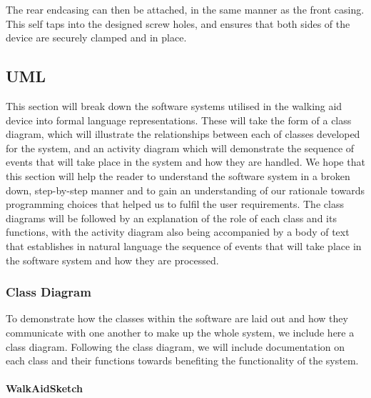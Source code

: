             The rear endcasing can then be attached, in the same manner as the front casing. This self taps into the designed screw holes, and ensures that both sides of the device are securely clamped and in place.


        \subsection{UML}
        \label{sec:uml_walk_aid}
        
            This section will break down the software systems utilised in the walking aid device into formal language representations. These will take the form of a class diagram, which will illustrate the relationships between each of classes developed for the system, and an activity diagram which will demonstrate the sequence of events that will take place in the system and how they are handled. We hope that this section will help the reader to understand the software system in a broken down, step-by-step manner and to gain an understanding of our rationale towards programming choices that helped us to fulfil the user requirements. The class diagrams will be followed by an explanation of the role of each class and its functions, with the activity diagram also being accompanied by a body of text that establishes in natural language the sequence of events that will take place in the software system and how they are processed.

            \subsubsection{Class Diagram}
            \label{subsubsec:class_diagram_walking_aid}

                To demonstrate how the classes within the software are laid out and how they communicate with one another to make up the whole system, we include here a class diagram. Following the class diagram, we will include documentation on each class and their functions towards benefiting the functionality of the system. 

                \clearpage
                \thispagestyle{empty}
                \begin{landscape}
                    
                \end{landscape}

                \paragraph{WalkAidSketch}\mbox{}


